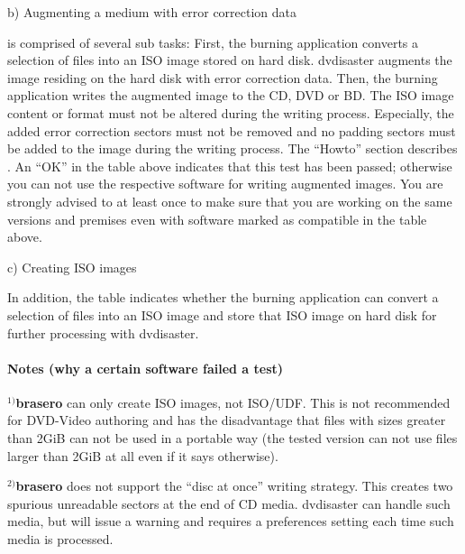 \bigskip

b) Augmenting a medium with error correction data

\medskip

 is comprised of
several sub tasks: First, the burning application converts a selection of files
into an ISO image stored on hard disk. dvdisaster augments the image residing
on the hard disk with error correction data. Then, the burning application
writes the augmented image to the CD, DVD or BD. The ISO image content or format
must not be altered during the writing process. Especially, the added error correction
sectors must not be removed and no padding sectors must be added to the image during
the writing process. The ``Howto'' section describes
. An ``OK'' in the table above indicates that this
test has been passed; otherwise you can not use the respective software for writing
augmented images. You are strongly advised to  at
least once to make sure that you are working on the same versions
and premises even with software marked as compatible in the table above.

\bigskip

c) Creating ISO images

\medskip

In addition, the table indicates whether the burning application can convert
a selection of files into an ISO image and store that ISO image on hard disk
for further processing with dvdisaster. 

\paragraph{Notes (why a certain software failed a test)}\quad
\medskip

$^{1)}${\bf brasero} can only create ISO images, not ISO/UDF. This is not
recommended for DVD-Video authoring and has the disadvantage that files
with sizes greater than 2GiB can not be used in a portable way (the tested
version can not use files larger than 2GiB at all even if it says otherwise).

\bigskip

$^{2)}${\bf brasero} does not support the ``disc at once'' writing strategy. This
creates two spurious unreadable sectors at the end of CD media. dvdisaster
can handle such media, but will issue a warning and requires a preferences
setting each time such media is processed.

